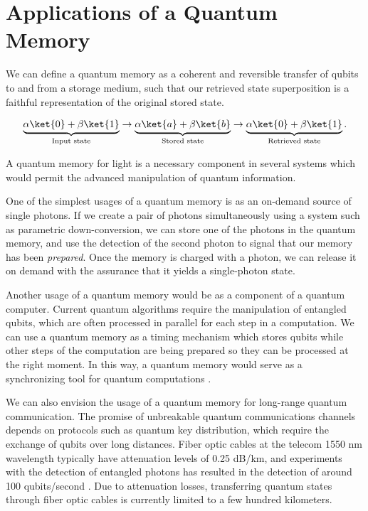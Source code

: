 \section{Applications of a Quantum Memory}

We can define a quantum memory as a coherent and reversible transfer of qubits to and from a storage medium, such that our retrieved state superposition is a faithful representation of the original stored state.

\begin{eqnarray}
  \label{eq:qmem}
  \underbrace{\alpha \ket{0} + \beta \ket{1}}_{\text{Input state}}  \rightarrow \underbrace{\alpha \ket{a} + \beta \ket{b}}_{\text{Stored state}} \rightarrow \underbrace{\alpha \ket{0} + \beta \ket{1}}_{\text{Retrieved state}}.
\end{eqnarray}

\noindent
A quantum memory for light is a necessary component in several systems which would permit the advanced manipulation of quantum information.  

One of the simplest usages of a quantum memory is as an on-demand source of  single photons.  If we create a pair of photons simultaneously using a system such as parametric down-conversion, we can store one of the photons in the quantum memory, and use the detection of the second photon to signal that our memory has been \emph{prepared}.  Once the memory is charged with a photon, we can release it on demand with the assurance that it yields a single-photon state.  

Another usage of a quantum memory would be as a component of a quantum computer.  Current quantum algorithms require the manipulation of entangled qubits, which are often processed in parallel for each step in a computation. We can use a quantum memory as a timing mechanism which stores qubits while other steps of the computation are being prepared so they can be processed at the right moment.  In this way, a quantum memory would serve as a synchronizing tool for quantum computations \cite{lvovsky2009optical}. 

We can also envision the usage of a quantum memory for long-range quantum communication.  The promise of unbreakable quantum communications channels depends on protocols such as quantum key distribution, which require the exchange of qubits over long distances.  Fiber optic cables at the telecom 1550 nm wavelength typically have attenuation levels of 0.25 dB/km, and experiments with the detection of entangled photons has resulted in the detection of around 100 qubits/second \cite{Zeilinger07b}.  Due to attenuation losses, transferring quantum states through fiber optic cables is currently limited to a few hundred kilometers.


